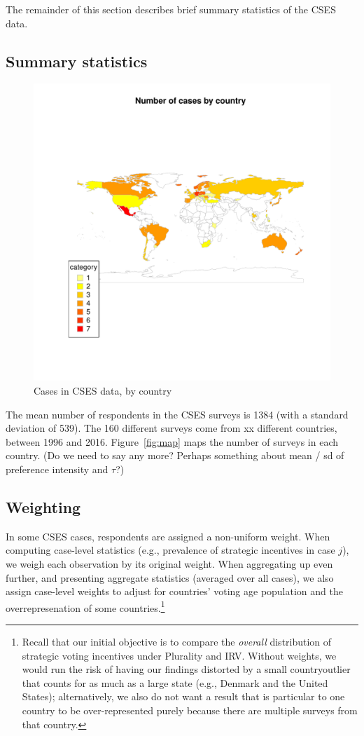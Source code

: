 \documentclass[12pt, letter]{article}
\begin{document}
The remainder of this section describes brief summary statistics of the CSES data.


\subsection{Summary statistics}

\begin{figure}[!htb]
	\centering
	\includegraphics[width = .5 \textwidth]{../output/figures/case_map.pdf}
	\caption{Cases in CSES data, by country}
	\label{fig:case_map}
\end{figure}

The mean number of respondents in the CSES surveys is 1384 (with a standard deviation of 539). The 160 different surveys come from xx different countries, between 1996 and 2016. Figure~\ref{fig:map} maps the number of surveys in each country. (Do we need to say any more? Perhaps something about mean / sd of preference intensity and $\tau$?)

\subsection{Weighting}

In some CSES cases, respondents are assigned a non-uniform weight. When computing case-level statistics (e.g., prevalence of strategic incentives in case $j$), we weigh each observation by its original weight. When aggregating up even further, and presenting aggregate statistics (averaged over all cases), we also assign case-level weights to adjust for countries' voting age population and the overrepresenation of some countries.\footnote{Recall that our initial objective is to compare the \textit{overall} distribution of strategic voting incentives under Plurality and IRV. Without weights, we would run the risk of having our findings distorted by a small countryoutlier that counts for as much as a large state (e.g., Denmark and the United States); alternatively, we also do not want a result that is particular to one country to be over-represented purely because there are multiple surveys from that country.}
\end{document}
